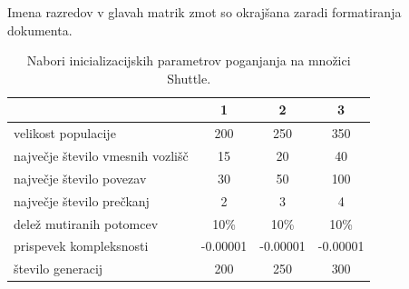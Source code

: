 Imena razredov v glavah matrik zmot so okrajšana zaradi formatiranja dokumenta.
\begin{table}[H]
    \begin{center}
        \begin{tabular}{||l c c c||}
            \hline
            & 1        & 2        & 3 \\ [0.5ex]
            \hline
            velikost populacije              & 200      & 250      & 350      \\
            \hline
            največje število vmesnih vozlišč & 15       & 20       & 40       \\
            \hline
            največje število povezav         & 30       & 50       & 100      \\
            \hline
            največje število prečkanj        & 2        & 3        & 4        \\
            \hline
            delež mutiranih potomcev         & 10\%     & 10\%     & 10\%     \\
            \hline
            prispevek kompleksnosti          & -0.00001 & -0.00001 & -0.00001 \\
            \hline
            število generacij                & 200      & 250      & 300      \\
            \hline
        \end{tabular}
    \end{center}
    \caption{Nabori inicializacijskih parametrov poganjanja na množici Shuttle.}
    \label{tab:param_statlog}
\end{table}

